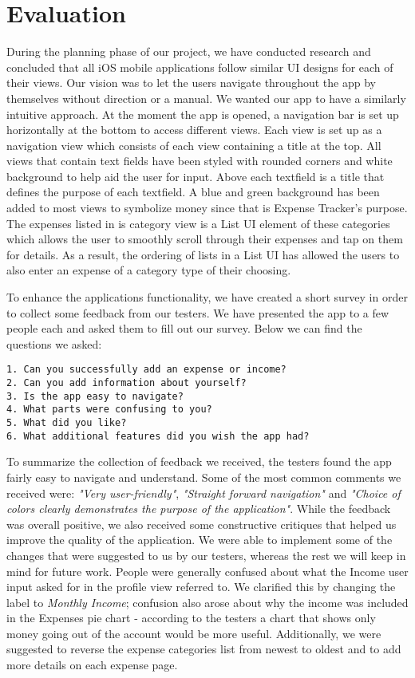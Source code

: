 \documentclass{article}
\begin{document}
\section{Evaluation}
During the planning phase of our project, we have conducted research and concluded that all iOS mobile applications follow similar UI designs for each of their views. Our vision was to let the users navigate throughout the app by themselves without direction or a manual. We wanted our app to have a similarly intuitive approach. At the moment the app is opened, a navigation bar is set up horizontally at the bottom to access different views. Each view is set up as a navigation view which consists of each view containing a title at the top. All views that contain text fields have been styled with rounded corners and white background to help aid the user for input. Above each textfield is a title that defines the purpose of each textfield. A blue and green background has been added to most views to symbolize money since that is Expense Tracker’s purpose. The expenses listed in is category view is a List UI element of these categories which allows the user to smoothly scroll through their expenses and tap on them for details. As a result, the ordering of lists in a List UI has allowed the users to also enter an expense of a category type of their choosing.

\vskip 0.2in
    To enhance the applications functionality, we have created a short survey in order to collect some feedback from our testers. We have presented the app to a few people each and asked them to fill out our survey. Below we can find the questions we asked:
\begin{verbatim} 
1. Can you successfully add an expense or income? 
2. Can you add information about yourself?
3. Is the app easy to navigate? 
4. What parts were confusing to you?
5. What did you like?
6. What additional features did you wish the app had? 
\end{verbatim} 

To summarize the collection of feedback we received, the testers found the app fairly easy to navigate and understand. Some of the most common comments we received were: \emph{"Very user-friendly"}, \emph{"Straight forward navigation"} and \emph{"Choice of colors clearly demonstrates the purpose of the application"}. While the feedback was overall positive, we also received some constructive critiques that helped us improve the quality of the application. We were able to implement some of the changes that were suggested to us by our testers, whereas the rest we will keep in mind for future work. People were generally confused about what the Income user input asked for in the profile view referred to. We clarified this by changing the label to \emph{Monthly Income}; confusion also arose about why the income was included in the Expenses pie chart - according to the testers a chart that shows only money going out of the account would be more useful. Additionally, we were suggested to reverse the expense categories list from newest to oldest and to add more details on each expense page. 
\end{document}
